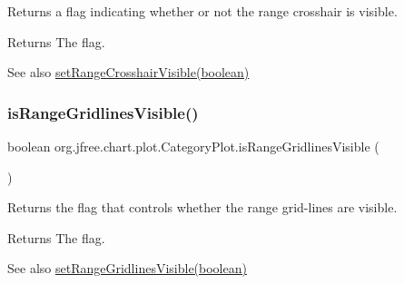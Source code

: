 Returns a flag indicating whether or not the range crosshair is visible.

\begin{DoxyReturn}{Returns}
The flag.
\end{DoxyReturn}
\begin{DoxySeeAlso}{See also}
\mbox{\hyperlink{classorg_1_1jfree_1_1chart_1_1plot_1_1_category_plot_a885d7f1c76a50bbd6c131e014fe917a5}{set\+Range\+Crosshair\+Visible(boolean)}} 
\end{DoxySeeAlso}
\mbox{\label{classorg_1_1jfree_1_1chart_1_1plot_1_1_category_plot_a31df08c763e3a5318983fa25ffad923c}} 
\subsubsection{\texorpdfstring{is\+Range\+Gridlines\+Visible()}{isRangeGridlinesVisible()}}
{\footnotesize\ttfamily boolean org.\+jfree.\+chart.\+plot.\+Category\+Plot.\+is\+Range\+Gridlines\+Visible (\begin{DoxyParamCaption}{ }\end{DoxyParamCaption})}

Returns the flag that controls whether the range grid-\/lines are visible.

\begin{DoxyReturn}{Returns}
The flag.
\end{DoxyReturn}
\begin{DoxySeeAlso}{See also}
\mbox{\hyperlink{classorg_1_1jfree_1_1chart_1_1plot_1_1_category_plot_a7430d1f431ac052d95edf4f6b516aea7}{set\+Range\+Gridlines\+Visible(boolean)}} 
\end{DoxySeeAlso}
\mbox{\label{classorg_1_1jfree_1_1chart_1_1plot_1_1_category_plot_a92a64a1079b22962279cb676a7b4d10c}} 
